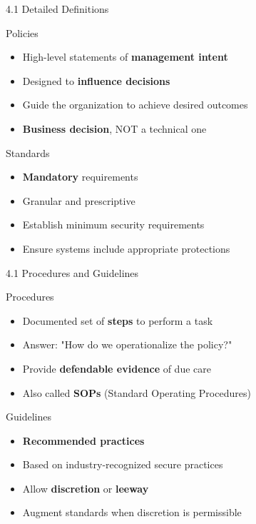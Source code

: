 \documentclass[10pt]{beamer}  %
\begin{document}
	\begin{frame}{4.1 Detailed Definitions}
		\begin{block}{Policies}
			\begin{itemize}
				\item High-level statements of \textbf{management intent}
				\item Designed to \textbf{influence decisions}
				\item Guide the organization to achieve desired outcomes
				\item \textbf{Business decision}, NOT a technical one
			\end{itemize}
		\end{block}
		
		\begin{block}{Standards}
			\begin{itemize}
				\item \textbf{Mandatory} requirements
				\item Granular and prescriptive
				\item Establish minimum security requirements
				\item Ensure systems include appropriate protections
			\end{itemize}
		\end{block}
	\end{frame}
	
	\begin{frame}{4.1 Procedures and Guidelines}
		\begin{block}{Procedures}
			\begin{itemize}
				\item Documented set of \textbf{steps} to perform a task
				\item Answer: "How do we operationalize the policy?"
				\item Provide \textbf{defendable evidence} of due care
				\item Also called \textbf{SOPs} (Standard Operating Procedures)
			\end{itemize}
		\end{block}
		
		\begin{block}{Guidelines}
			\begin{itemize}
				\item \textbf{Recommended practices}
				\item Based on industry-recognized secure practices
				\item Allow \textbf{discretion} or \textbf{leeway}
				\item Augment standards when discretion is permissible
			\end{itemize}
		\end{block}
	\end{frame}
	
\end{document}
